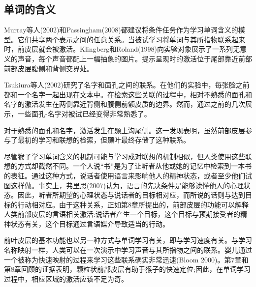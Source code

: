 \subsection{单词的含义}
Murray等人(2002)和Passingham(2008)都建议将条件任务作为学习单词含义的模型。它们共享两个表示之间的任意关系。当被试学习将单词与其所指物联系起来时，前皮层就会被激活。Klingberg和Roland(1998)向实验对象展示了一系列无意义的声音，每个声音都配上一幅抽象的图片。提示呈现时的激活位于尾部靠近前部前部皮层腹侧和背侧交界处。
\par
Tsukiura等人(2002)研究了名字和面孔之间的联系。在他们的实验中，每张脸之前都和一个名字一起出现在文本中。在检索这些关联的过程中，相对不熟悉的面孔和名字的激活发生在两侧靠近背侧和腹侧前额皮质的边界。然而，通过之前的几次展示，一些面孔-名字对被试已经变得非常熟悉了。
\par
对于熟悉的面孔和名字，激活发生在颞上沟尾侧。这一发现表明，虽然前部皮层参与了最初的学习和联想的检索，但颞叶最终存储了这种联系。
\par
尽管猴子学习单词含义的机制可能与学习成对联想的机制相似，但人类使用这些联想的方式却截然不同。一个人说“书”是为了让听者从他或她的记忆中检索到一本书的表征。通过这种方式，说话者使用语言来影响他人的精神状态，或者至少他们试图这样做。事实上，弗里思(2007)认为，语言的先决条件是能够读懂他人的心理状态。因此，听者所期望的心理状态与说话者的目标相对应，而所说的话则与达到目标的行动相对应。由于这种关系，正如第8章所提出的，前部皮层的功能可以解释人类前部皮层的言语相关激活:说话者产生一个目标，这个目标与预期接受者的精神状态有关，这个目标通过言语媒介导致适当的行动。
\par
前叶皮层的基本功能也以另一种方式与单词学习有关，即与学习速度有关。与学习名称映射一样，人类可以在一次演示中学习声音与其所指物之间的联系。婴儿通过一个被称为快速映射的过程来学习这些联系确实非常迅速(Bloom 2000)。第7章和第8章回顾的证据表明，颗粒状前部皮层有助于猴子的快速定位;因此，在单词学习过程中，相应区域的激活应该不足为奇。
